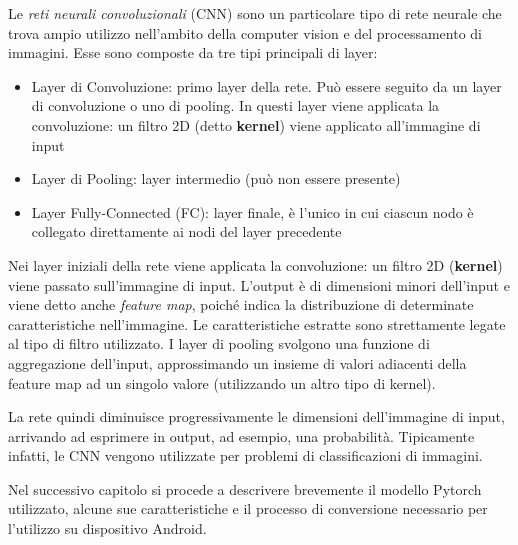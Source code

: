 Le \textit{reti neurali convoluzionali} (CNN) sono un particolare tipo di rete neurale che trova ampio utilizzo nell'ambito
della computer vision e del processamento di immagini. Esse sono composte da tre tipi principali di layer:

\begin{itemize}
    \item Layer di Convoluzione: primo layer della rete. Può essere seguito da un layer di convoluzione o uno di pooling.
    In questi layer viene applicata la convoluzione: un filtro 2D (detto \textbf{kernel}) viene applicato all'immagine di
    input
    \item Layer di Pooling: layer intermedio (può non essere presente)
    \item Layer Fully-Connected (FC): layer finale, è l'unico in cui ciascun nodo è collegato direttamente ai nodi del
    layer precedente
\end{itemize}

Nei layer iniziali della rete viene applicata la convoluzione: un filtro 2D (\textbf{kernel}) viene passato sull'immagine
di input. L'output è di dimensioni minori dell'input e viene detto anche \textit{feature map}, poiché indica la distribuzione
di determinate caratteristiche nell'immagine. Le caratteristiche estratte sono strettamente legate al tipo di filtro utilizzato.
I layer di pooling svolgono una funzione di aggregazione dell'input, approssimando un insieme di valori adiacenti della feature
map ad un singolo valore (utilizzando un altro tipo di kernel).

La rete quindi diminuisce progressivamente le dimensioni dell'immagine di input, arrivando ad esprimere in output, ad esempio,
una probabilità. Tipicamente infatti, le CNN vengono utilizzate per problemi di classificazioni di immagini.

Nel successivo capitolo si procede a descrivere brevemente il modello Pytorch utilizzato, alcune sue caratteristiche
e il processo di conversione necessario per l'utilizzo su dispositivo Android.
